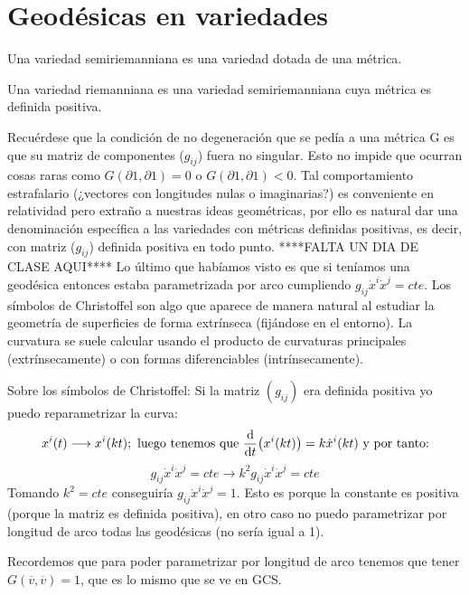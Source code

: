 \documentclass[palatino, bibnumbers]{apuntes}
\begin{document}
\section{Geodésicas en variedades}
\begin{defn} Una variedad semiriemanniana es una variedad dotada de una métrica.
\end{defn}

\begin{defn} Una variedad riemanniana es una variedad semiriemanniana cuya métrica es definida positiva.
\end{defn}

Recuérdese que la condición de no degeneración que se pedía a una métrica G es que su matriz de componentes ($g_{ij}$) fuera no singular. Esto no impide que ocurran cosas raras como $G(∂1, ∂1) = 0$  o $G(∂1, ∂1) < 0$. Tal comportamiento estrafalario (¿vectores con longitudes nulas o imaginarias?) es conveniente en relatividad pero extraño a nuestras ideas geométricas, por ello es natural dar una denominación específica a las variedades con métricas definidas positivas, es decir, con matriz ($g_{ij}$) definida positiva en todo punto.\newline
****FALTA UN DIA DE CLASE AQUI****\newline
Lo último que habíamos visto es que si teníamos una geodésica entonces estaba parametrizada por arco cumpliendo $g_{ij}\dot{x}^i\dot{x}^j=cte$.
Los símbolos de Christoffel son algo que aparece de manera natural al estudiar la geometría de superficies de forma extrínseca (fijándose en el entorno). La curvatura se suele calcular usando el producto de curvaturas principales (extrínsecamente) o con formas diferenciables (intrínsecamente).

Sobre los símbolos de Christoffel: Si la matriz $(g_{ij})$ era definida positiva yo puedo reparametrizar la curva: $$x^i(t)\longrightarrow x^i(kt); \text{ luego tenemos que } \dv{t}(x^i(kt))=k\dot{x}^i(kt)\text{ y por tanto:}$$$$ g_{ij}\dot{x}^i\dot{x}^j=cte\longrightarrow  k^2g_{ij}\dot{x}^i\dot{x}^j=cte$$
Tomando $k^2=cte$ conseguiría $g_{ij}\dot{x}^i\dot{x}^j=1$. Esto es porque la constante es positiva (porque la matriz es definida positiva), en otro caso no puedo parametrizar por longitud de arco todas las geodésicas (no sería igual a 1).
\begin{obs}Recordemos que para poder parametrizar por longitud de arco tenemos que tener $G(\overline{v},\overline{v})=1$, que es lo mismo que se ve en GCS.
\end{obs}
\end{document}
